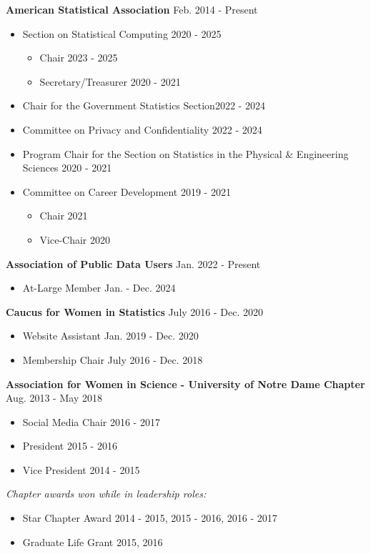 \textbf{American Statistical Association} \hfill Feb. 2014 - Present
    \begin{itemize}
        \item Section on Statistical Computing \hfill 2020 - 2025
        \begin{itemize}
            \item Chair \hfill 2023 - 2025
            \item Secretary/Treasurer \hfill 2020 - 2021
        \end{itemize}
        \item Chair for the Government Statistics Section\hfill 2022 - 2024
        \item Committee on Privacy and Confidentiality \hfill 2022 - 2024
        \item Program Chair for the Section on Statistics in the Physical \& Engineering Sciences \hfill 2020 - 2021
        \item Committee on Career Development \hfill 2019 - 2021
        \begin{itemize}
            \item Chair \hfill 2021
            \item Vice-Chair \hfill 2020
        \end{itemize}
    \end{itemize}

\textbf{Association of Public Data Users} \hfill Jan. 2022 - Present
    \begin{itemize}
        \item At-Large Member \hfill Jan. - Dec. 2024
    \end{itemize}
    
\leadershipspace
\textbf{Caucus for Women in Statistics} \hfill July 2016 - Dec. 2020
\begin{itemize}
    \item Website Assistant \hfill Jan. 2019 - Dec. 2020
    \item Membership Chair \hfill July 2016 - Dec. 2018
\end{itemize}

\leadershipspace
\textbf{Association for Women in Science - University of Notre Dame Chapter} \hfill Aug. 2013 - May 2018
\begin{itemize}
    \item Social Media Chair \hfill 2016 - 2017
    \item President \hfill 2015 - 2016
    \item Vice President \hfill 2014 - 2015
\end{itemize}
\textit{Chapter awards won while in leadership roles:}
\begin{itemize}
    \item Star Chapter Award \hfill 2014 - 2015, 2015 - 2016, 2016 - 2017
    \item Graduate Life Grant \hfill 2015, 2016
\end{itemize}

